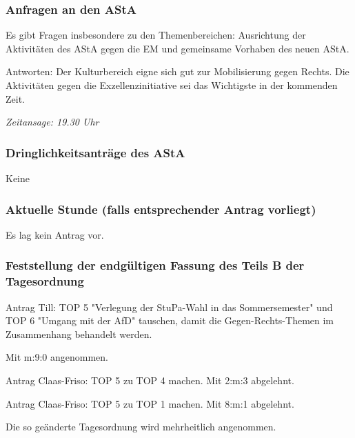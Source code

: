 \documentclass[ngerman,headheight=70pt]{scrartcl}
\begin{document}
    \subsubsection{Anfragen an den AStA}

    Es gibt Fragen insbesondere zu den Themenbereichen: Ausrichtung der Aktivitäten
    des AStA gegen die EM und gemeinsame Vorhaben des neuen AStA.

    Antworten: Der Kulturbereich eigne sich gut zur Mobilisierung gegen Rechts.
    Die Aktivitäten gegen die Exzellenzinitiative sei das Wichtigste in der
    kommenden Zeit.

    \textit{Zeitansage: 19.30 Uhr}

    \subsubsection{Dringlichkeitsanträge des AStA}

    Keine

    \subsubsection{Aktuelle Stunde (falls entsprechender Antrag vorliegt)}

    Es lag kein Antrag vor.

    \subsubsection{Feststellung der endgültigen Fassung des Teils B der Tagesordnung}

    Antrag Till: TOP 5 "Verlegung der StuPa-Wahl in das Sommersemester" und
    TOP 6 "Umgang mit der AfD" tauschen, damit die Gegen-Rechts-Themen im
    Zusammenhang behandelt werden.

    Mit m:9:0 angenommen.

    Antrag Claas-Friso: TOP 5 zu TOP 4 machen. Mit 2:m:3 abgelehnt.

    Antrag Claas-Friso: TOP 5 zu TOP 1 machen. Mit 8:m:1 abgelehnt.

    Die so geänderte Tagesordnung wird mehrheitlich angenommen.
\end{document}
